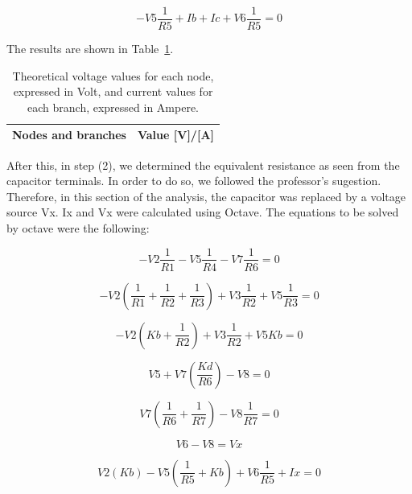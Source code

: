 \begin{equation}
-V5\frac{1}{R5} + Ib + Ic + V6\frac{1}{R5}= 0
\end{equation}

The results are shown in Table~\ref{tab:TA1}.

\begin{table}[h]
  \centering
  \begin{tabular}{|l|r|}
    \hline    
    {\bf Nodes and branches} & {\bf Value [V]/[A]} \\ \hline
    
  \end{tabular}
  \caption{Theoretical voltage values for each node, expressed in Volt, and current values for each branch, expressed in Ampere.}
  \label{tab:TA1}
\end{table}

After this, in step (2), we determined the equivalent resistance as seen from the capacitor terminals. In order to do so, we followed the professor's sugestion. Therefore, in this section of the analysis, the capacitor was replaced by a voltage source Vx. Ix and Vx were calculated using Octave.
The equations to be solved by octave were the following:

\begin{equation}
  -V2\frac{1}{R1}  - V5\frac{1}{R4}  -  V7\frac{1}{R6}  = 0
\end{equation}

\begin{equation}
  - V2(\frac{1}{R1}+\frac{1}{R2}+\frac{1}{R3})  + V3\frac{1}{R2} + V5\frac{1}{R3} = 0
\end{equation}

\begin{equation}
  -V2(Kb+\frac{1}{R2}) +V3\frac{1}{R2} + V5Kb = 0
\end{equation}

\begin{equation}
  V5 + V7(\frac{Kd}{R6}) - V8= 0
\end{equation}

\begin{equation}
  V7(\frac{1}{R6}+\frac{1}{R7}) - V8\frac{1}{R7}= 0
\end{equation}

\begin{equation}
  V6 - V8 = Vx
\end{equation}

\begin{equation}
   V2(Kb)  - V5(\frac{1}{R5} +Kb) + V6\frac{1}{R5} + Ix = 0
\end{equation}

